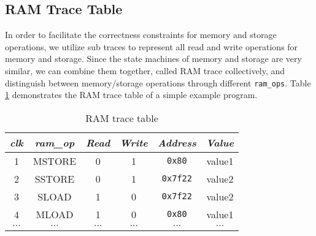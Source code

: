 \subsection{RAM Trace Table}

In order to facilitate the correctness constraints for memory and storage operations, we utilize sub traces to represent all read and write operations for memory and storage. Since the state machines of memory and storage are very similar, we can combine them together, called RAM trace collectively, and distinguish between memory/storage operations through different \verb|ram_ops|. Table \ref{table:ram-trace-table} demonstrates the RAM trace table of a simple example program.
\begin{table}[!ht]
    \centering
    \begin{tabular}{|c|c|c|c|c|c|}
    \hline
    \emph{clk} & \emph{ram\_op} & \emph{Read} & \emph{Write} & \emph{Address} & \emph{Value} \\ \hline
    1 & MSTORE & 0 & 1 & \texttt{0x80} & value1 \\
    2 & SSTORE & 0 & 1 & \texttt{0x7f22} & value2 \\
    3 & SLOAD & 1 & 0 & \texttt{0x7f22} & value2 \\
    4 & MLOAD & 1 & 0 & \texttt{0x80} & value1 \\
    $\cdots$ & $\cdots$ & $\cdots$ & $\cdots$ & $\cdots$ & $\cdots$ \\ \hline
    \end{tabular}
    \caption{RAM trace table}
    \label{table:ram-trace-table}
\end{table}

